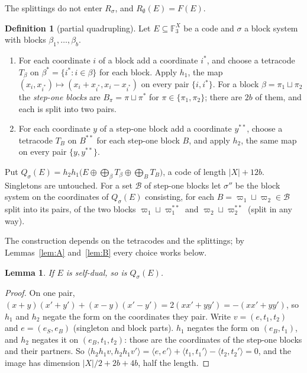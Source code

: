 \documentclass[11pt]{amsart}
\newtheorem{lemma}[theorem]{Lemma}
\theoremstyle{definition}
\newtheorem{definition}[theorem]{Definition}
\newcommand{\F}{\mathbb{F}_3}
\newcommand{\cB}{\mathcal{B}}
\begin{document}
The splittings do not enter $R_\sigma$, and $R_\emptyset(E)=F(E)$.

\begin{definition}[partial quadrupling]\label{def:Q}
Let $E\subseteq\F^X$ be a code and $\sigma$ a block system with blocks $\beta_1,\dots,\beta_b$.
\begin{enumerate}
\item[(1)] For each coordinate $i$ of a block add a coordinate $i^*$, and choose a tetracode
  $T_\beta$ on $\beta^*=\{i^*:i\in\beta\}$ for each block. Apply $h_1$, the map
  $(x_i,x_{i^*})\mapsto(x_i+x_{i^*},x_i-x_{i^*})$ on every pair $\{i,i^*\}$. For a block
  $\beta=\pi_1\sqcup\pi_2$ the \emph{step-one blocks} are $B_{\pi}=\pi\sqcup\pi^*$ for
  $\pi\in\{\pi_1,\pi_2\}$; there are $2b$ of them, and each is split into two pairs.
\item[(2)] For each coordinate $y$ of a step-one block add a coordinate $y^{**}$, choose a
  tetracode $T_B$ on $B^{**}$ for each step-one block $B$, and apply $h_2$, the same map on every
  pair $\{y,y^{**}\}$.
\end{enumerate}
Put $Q_\sigma(E)=h_2h_1\bigl(E\oplus\bigoplus_\beta T_\beta\oplus\bigoplus_BT_B\bigr)$, a code of
length $|X|+12b$. Singletons are untouched. For a set $\cB$ of step-one blocks let $\sigma''$ be the
block system on the coordinates of $Q_\sigma(E)$ consisting, for each $B=\varpi_1\sqcup\varpi_2\in\cB$
split into its pairs, of the two blocks $\varpi_1\sqcup\varpi_1^{**}$ and
$\varpi_2\sqcup\varpi_2^{**}$ (split in any way).
\end{definition}

The construction depends on the tetracodes and the splittings; by Lemmas~\ref{lem:A}
and~\ref{lem:B} every choice works below.

\begin{lemma}\label{lem:selfdual}
If $E$ is self-dual, so is $Q_\sigma(E)$.
\end{lemma}

\begin{proof}
On one pair, $(x+y)(x'+y')+(x-y)(x'-y')=2(xx'+yy')=-(xx'+yy')$, so $h_1$ and $h_2$ negate the form
on the coordinates they pair. Write $v=(e,t_1,t_2)$ and $e=(e_S,e_B)$ (singleton and block parts).
$h_1$ negates the form on $(e_B,t_1)$, and $h_2$ negates it on $(e_B,t_1,t_2)$: those are the
coordinates of the step-one blocks and their partners. So
$\langle h_2h_1v,h_2h_1v'\rangle=\langle e,e'\rangle+\langle t_1,t_1'\rangle-\langle t_2,t_2'\rangle=0$,
and the image has dimension $|X|/2+2b+4b$, half the length.
\end{proof}
\end{document}
